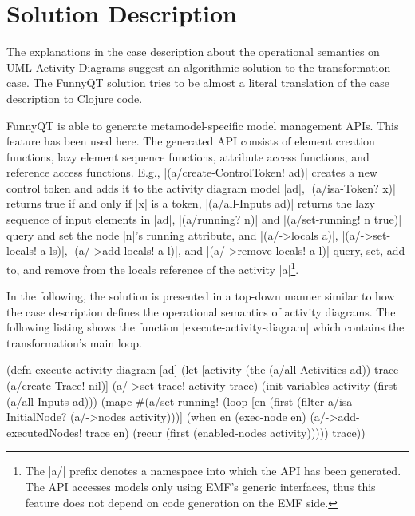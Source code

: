 \documentclass[submission]{eptcs}
\newcommand{\code}{\clojureinline}
\begin{document}
\section{Solution Description}
\label{sec:solution-description}

The explanations in the case description about the operational semantics on UML
Activity Diagrams suggest an algorithmic solution to the transformation case.
The FunnyQT solution tries to be almost a literal translation of the case
description to Clojure code.

FunnyQT is able to generate metamodel-specific model management APIs.  This
feature has been used here.  The generated API consists of element creation
functions, lazy element sequence functions, attribute access functions, and
reference access functions.  E.g., \code|(a/create-ControlToken! ad)| creates a
new control token and adds it to the activity diagram model \code|ad|,
\code|(a/isa-Token? x)| returns true if and only if \code|x| is a token,
\code|(a/all-Inputs ad)| returns the lazy sequence of input elements in
\code|ad|, \code|(a/running? n)| and \code|(a/set-running! n true)| query and
set the node \code|n|'s \textsf{running} attribute, and \code|(a/->locals a)|,
\code|(a/->set-locals! a ls)|, \code|(a/->add-locals! a l)|, and
\code|(a/->remove-locals! a l)| query, set, add to, and remove from the
\textsf{locals} reference of the activity \code|a|\footnote{The \code|a/|
  prefix denotes a namespace into which the API has been generated.  The API
  accesses models only using EMF's generic interfaces, thus this feature does
  not depend on code generation on the EMF side.}.

In the following, the solution is presented in a top-down manner similar to how
the case description defines the operational semantics of activity diagrams.
The following listing shows the function \code|execute-activity-diagram| which
contains the transformation's main loop.

\begin{clojurecode}
(defn execute-activity-diagram [ad]
  (let [activity (the (a/all-Activities ad))
        trace (a/create-Trace! nil)]
    (a/->set-trace! activity trace)
    (init-variables activity (first (a/all-Inputs ad)))
    (mapc #(a/set-running! %
    (loop [en (first (filter a/isa-InitialNode? (a/->nodes activity)))]
      (when en
        (exec-node en)
        (a/->add-executedNodes! trace en)
        (recur (first (enabled-nodes activity)))))
    trace))
\end{clojurecode}
\end{document}
